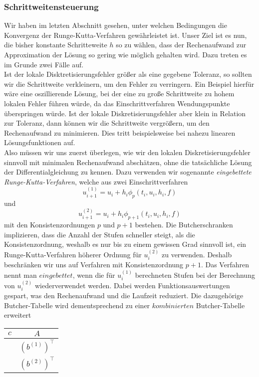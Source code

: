 \subsubsection{Schrittweitensteuerung}
Wir haben im letzten Abschnitt gesehen, unter welchen Bedingungen die Konvergenz der Runge-Kutta-Verfahren
gewährleistet ist. Unser Ziel ist es nun, die bisher konstante Schritteweite $h$ so zu wählen, dass der Rechenaufwand
zur Approximation der Lösung so gering wie möglich gehalten wird. Dazu treten es im Grunde zwei Fälle auf.\\
Ist der lokale Disktretisierungsfehler größer als eine gegebene Toleranz, so sollten wir die Schrittweite verkleinern,
um den Fehler zu verringern. Ein Beispiel hierfür wäre eine oszillierende Lösung, bei der eine zu große Schrittweite
zu hohem lokalen Fehler führen würde, da das Einschrittverfahren Wendungspunkte überspringen würde.
Ist der lokale Diskretisierungsfehler aber klein in Relation zur Toleranz, dann können wir die Schrittweite
vergrößern, um den Rechenaufwand zu minimieren. Dies tritt beispielsweise bei nahezu linearen Lösungsfunktionen auf. \\
Also müssen wir uns zuerst überlegen, wie wir den lokalen Diskretisierungsfehler sinnvoll mit minimalen Rechenaufwand
abschätzen, ohne die tatsächliche Lösung der Differentialgleichung zu kennen. Dazu verwenden wir sogenannte
\textit{eingebettete Runge-Kutta-Verfahren}, welche aus zwei Einschrittverfahren
\[
    u_{i+1}^{(1)} = u_i + h_i \phi_{p}(t_i,u_i,h_i,f)
\]
und
\[
    u_{i+1}^{(2)} = u_i + h_i \phi_{p+1}(t_i,u_i,h_i,f)
\]
mit den Konsistenzordnungen $p$ und $p+1$ bestehen. Die Butcherschranken implizieren, dass die Anzahl
der Stufen schneller steigt, als die Konsistenzordnung, weshalb es nur bis zu einem gewissen Grad sinnvoll ist, ein
Runge-Kutta-Verfahren höherer Ordnung für $u_i^{(2)}$ zu verwenden. Deshalb beschränken wir uns auf Verfahren mit
Konsistenzordnung $p+1$.
Das Verfahren nennt man $eingebettet$, wenn die für $u_i^{(1)}$ berechneten Stufen bei der Berechnung von $u_i^{(2)}$
wiederverwendet werden. Dabei werden Funktionsauswertungen gespart, was den Rechenaufwand und die Laufzeit reduziert.
Die dazugehörige Butcher-Tabelle wird dementsprechend zu einer $kombinierten$ Butcher-Tabelle erweitert
\begin{center}
    \begin{tabular}{c | c}
        $c$ & $A$ \\
        \hline
        & $(b^{(1)})^{\intercal}$ \\
        \hline
        & $(b^{(2)})^{\intercal}$
    \end{tabular}
\end{center}
